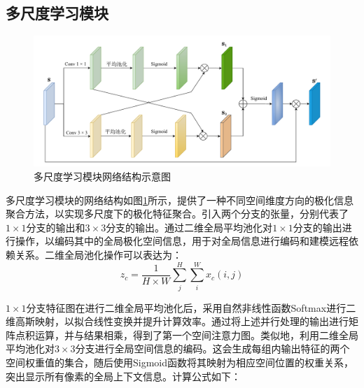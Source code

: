 


\subsection{多尺度学习模块}
\label{sec:多尺度学习模块}
\begin{figure}[ht!]
    \centering
    \includegraphics[width=14cm]{pic/chapter3/跨空间学习.pdf}
    \caption{多尺度学习模块网络结构示意图}
    \label{DPEN_CSL}
\end{figure}

多尺度学习模块的网络结构如图\ref{DPEN_CSL}所示，提供了一种不同空间维度方向的极化信息聚合方法，以实现多尺度下的极化特征聚合。引入两个分支的张量，分别代表了$1\times 1$分支的输出和$3 \times 3$分支的输出。通过二维全局平均池化对$1\times 1$分支的输出进行操作，以编码其中的全局极化空间信息，用于对全局信息进行编码和建模远程依赖关系。二维全局池化操作可以表达为：
\begin{equation}
    z_c=\frac{1}{H\times W}\sum_{j}^{H}\sum_{i}^{W}x_c(i,j)
\end{equation}

$1\times 1$分支特征图在进行二维全局平均池化后，采用自然非线性函数Softmax进行二维高斯映射，以拟合线性变换并提升计算效率。通过将上述并行处理的输出进行矩阵点积运算，并与结果相乘，得到了第一个空间注意力图。类似地，利用二维全局平均池化对$3\times 3$分支进行全局空间信息的编码。这会生成每组内输出特征的两个空间权重值的集合，随后使用Sigmoid函数将其映射为相应空间位置的权重关系，突出显示所有像素的全局上下文信息。计算公式如下：

